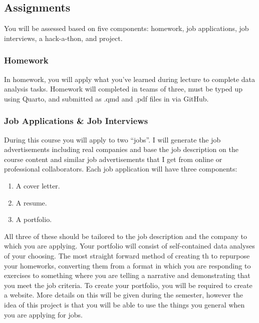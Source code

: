 \documentclass[
  letterpaper,
  DIV=11,
  numbers=noendperiod]{scrartcl}
\providecommand{\tightlist}{%
  \setlength{\itemsep}{0pt}\setlength{\parskip}{0pt}}\usepackage{longtable,booktabs,array}
\begin{document}
\subsection{Assignments}\label{assignments}

You will be assessed based on five components: homework, job
applications, job interviews, a hack-a-thon, and project.

\subsubsection{Homework}\label{homework}

In homework, you will apply what you've learned during lecture to
complete data analysis tasks. Homework will completed in teams of three,
must be typed up using Quarto, and submitted as .qmd and .pdf files in
via GitHub.

\subsubsection{Job Applications \& Job
Interviews}\label{job-applications-job-interviews}

During this course you will apply to two ``jobs''. I will generate the
job advertisements including real companies and base the job description
on the course content and similar job advertisements that I get from
online or professional collaborators. Each job application will have
three components:

\begin{enumerate}
\def\labelenumi{\arabic{enumi}.}
\tightlist
\item
  A cover letter.
\item
  A resume.
\item
  A portfolio.
\end{enumerate}

All three of these should be tailored to the job description and the
company to which you are applying. Your portfolio will consist of
self-contained data analyses of your choosing. The most straight forward
method of creating th to repurpose your homeworks, converting them from
a format in which you are responding to exercises to something where you
are telling a narrative and demonstrating that you meet the job
criteria. To create your portfolio, you will be required to create a
website. More details on this will be given during the semester, however
the idea of this project is that you will be able to use the things you
general when you are applying for jobs.
\end{document}

